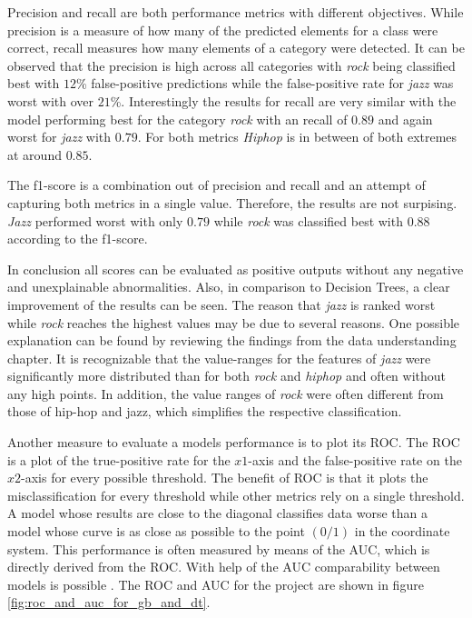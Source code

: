 Precision and recall are both performance metrics with different objectives. While precision is a measure of how many of the 
predicted elements for a class were correct, recall measures how many elements of a category were detected. It can be observed that 
the precision is high across all categories with \emph{rock} being classified best with \(12\)\% false-positive predictions while 
the false-positive rate for \emph{jazz} was worst with over \(21\)\%. Interestingly the results for recall are very similar with the model 
performing best for the category \emph{rock} with an recall of \(0.89\) and again worst for \emph{jazz} with \(0.79\). For both metrics \emph{Hiphop} is in
between of both extremes at around \(0.85\). 

The f1-score is a combination out of precision and recall and an attempt of capturing both metrics in a single value. Therefore,
the results are not surpising. \emph{Jazz} performed worst with only \(0.79\) while \emph{rock} was classified best with \(0.88\) according to the 
f1-score. 

In conclusion all scores can be evaluated as positive outputs without any negative and unexplainable abnormalities. Also, in comparison 
to Decision Trees, a clear improvement of the results can be seen. The reason that \emph{jazz} is ranked worst while \emph{rock} reaches the 
highest values may be due to several reasons. One possible explanation can be found by reviewing the findings from the data 
understanding chapter. It is recognizable that the value-ranges for the features of \emph{jazz} were significantly more distributed 
than for both \emph{rock} and \emph{hiphop} and often without any high points. In addition, the value ranges of \emph{rock} were often different from 
those of hip-hop and jazz, which simplifies the respective classification. 

Another measure to evaluate a models performance is to plot its \ac{ROC}. The \ac{ROC} is a plot of the true-positive
rate for the \(x1\)-axis and the false-positive rate on the \(x2\)-axis for every possible threshold. The benefit of \ac{ROC} is that it plots the 
misclassification for every threshold while other metrics rely on a single threshold. A model whose results are close to the diagonal classifies data worse than a 
model whose curve is as close as possible to the point \((0/1)\) in the coordinate system. This performance is often measured by means of 
the \ac{AUC}, which is directly derived from the \ac{ROC}. With help of the \ac{AUC} comparability between models is possible \cite[p. 862f]{fawcett2006introduction} \cite{scikit-roc_and_auc}. 
The \ac{ROC} and \ac{AUC} for the project are shown in figure \ref{fig:roc_and_auc_for_gb_and_dt}. 

